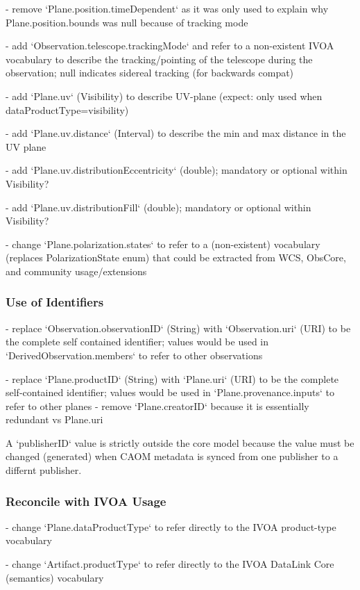 \documentclass[11pt,a4paper]{ivoa}
\begin{document}
- remove `Plane.position.timeDependent` as it was only used to explain why Plane.position.bounds was null because of tracking mode

- add `Observation.telescope.trackingMode` and refer to a non-existent IVOA vocabulary to describe the 
  tracking/pointing of the telescope during the observation; null indicates sidereal tracking (for backwards compat)

- add `Plane.uv` (Visibility) to describe UV-plane (expect: only used when dataProductType=visibility)

- add `Plane.uv.distance` (Interval) to describe the min and max distance in the UV plane

- add `Plane.uv.distributionEccentricity` (double); mandatory or optional within Visibility?

- add `Plane.uv.distributionFill` (double); mandatory or optional within Visibility?

- change `Plane.polarization.states` to refer to a (non-existent) vocabulary (replaces PolarizationState enum) that could be extracted from WCS, ObsCore, and community usage/extensions

\subsubsection{Use of Identifiers}

- replace `Observation.observationID` (String) with `Observation.uri` (URI) to be the complete self contained identifier; values would be used in `DerivedObservation.members` to refer to other observations
  
- replace `Plane.productID` (String) with `Plane.uri` (URI) to be the complete self-contained identifier; values would be used in `Plane.provenance.inputs` to refer to other planes
- remove `Plane.creatorID` because it is essentially redundant vs Plane.uri

A `publisherID` value is strictly outside the core model because the value must be changed (generated) when CAOM metadata is synced from one publisher to a differnt publisher.

\subsubsection{Reconcile with IVOA Usage}

- change `Plane.dataProductType` to refer directly to the IVOA product-type vocabulary

- change `Artifact.productType` to refer directly to the IVOA DataLink Core (semantics) vocabulary
\end{document}
